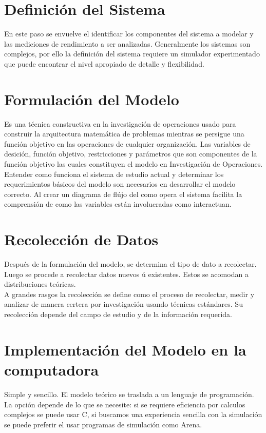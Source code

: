 \documentclass[letterpaper, 12pt]{article}
\begin{document}
    \newpage
    \begin{justify}
        \setcounter{page}{1}
        \thispagestyle{fancy}
        \section*{Definición del Sistema}
        \justify
        En este paso se envuelve el identificar los componentes del sistema a modelar y las mediciones de rendimiento a ser analizadas. Generalmente
        los sistemas son complejos, por ello la definición del sistema requiere un simulador experimentado que puede encontrar el nivel apropiado de detalle y flexibilidad.
        \section*{Formulación del Modelo}
        \justify
        Es una técnica constructiva en la investigación de operaciones usado para construir la arquitectura matemática de problemas mientras se persigue una función objetivo en las operaciones
        de cualquier organización. Las variables de desición, función objetivo, restricciones y parámetros que son componentes de la función objetivo las cuales constituyen el modelo en Investigación de Operaciones.
        \\\newline
        Entender como funciona el sistema de estudio actual y determinar los requerimientos básicos del modelo son necesarios en desarrollar el modelo correcto. Al crear un diagrama de flújo del como opera el sistema facilita
        la comprensión de como las variables están involucradas como interactuan.
        \section*{Recolección de Datos}
        \justify
        Después de la formulación del modelo, se determina el tipo de dato a recolectar. Luego se procede a recolectar datos nuevos ú existentes. Estos se acomodan a distribuciones teóricas. 
        \\\newline
        A grandes rasgos la recolección se define como el proceso de recolectar, medir y analizar de manera certera por investigación usando técnicas estándares. Su recolección depende del campo de estudio y de la información requerida.
        \section*{Implementación del Modelo en la computadora}
        \justify
        Simple y sencillo. El modelo teórico se traslada a un lenguaje de programación. La opción depende de lo que se necesite: si se requiere eficiencia por calculos complejos se puede usar C, si buscamos una experiencia sencilla con la simulación
        se puede preferir el usar programas de simulación como Arena.

\end{justify}
\end{document}
